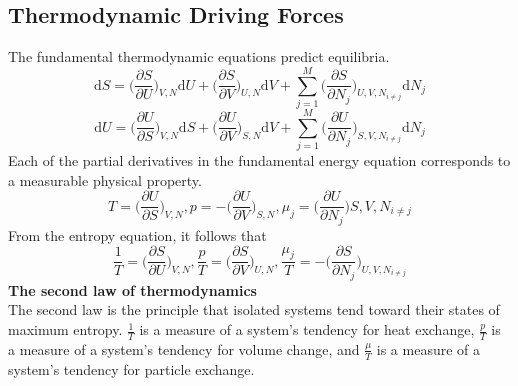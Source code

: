\documentclass[8pt]{article}
\numberwithin{equation}{section}
\begin{document}
\begin{multicols}{2}
\section{Thermodynamic Driving Forces}
The fundamental thermodynamic equations predict equilibria. 
\begin{equation}
\mathrm{d} S=\bigg(\frac{\partial S}{\partial U} \bigg)_{V,N} \mathrm{d} U + \bigg(\frac{\partial S}{\partial V}\bigg)_{U,N} \mathrm{d} V + \sum_{j=1}^{M}\bigg(\frac{\partial S}{\partial N_{j}}\bigg)_{U,V, N_{i\neq j}} \mathrm{d} N_{j}
\end{equation}
\begin{equation}
\mathrm{d} U=\bigg(\frac{\partial U}{\partial S} \bigg)_{V,N} \mathrm{d} S + \bigg(\frac{\partial U}{\partial V}\bigg)_{S,N} \mathrm{d} V + \sum_{j=1}^{M} \bigg(\frac{\partial U}{\partial N_{j}} \bigg)_{S,V, N_{i\neq j}} \mathrm{d} N_{j}
\end{equation}
Each of the partial derivatives in the fundamental energy equation corresponds to a measurable physical property. 
\begin{equation}
T=\bigg(\frac{\partial U}{\partial S}\bigg)_{V,N}, p=-\bigg(\frac{\partial U}{\partial V}\bigg)_{S,N}, \mu_{j}=\bigg( \frac{\partial U}{\partial N_{j}} \bigg){S,V, N_{i\neq j}} \tag{6.3}
\end{equation}
From the entropy equation, it follows that 
\begin{equation}
\frac{1}{T}=\bigg(\frac{\partial S}{\partial U} \bigg)_{V,N}, \frac{p}{T}=\bigg( \frac{\partial S}{\partial V} \bigg)_{U,N}, \frac{\mu_{j}}{T}=-\bigg( \frac{\partial S}{\partial N_{j}} \bigg)_{U,V, N_{i\neq j}} \tag{6.6}
\end{equation}
\textbf{The second law of thermodynamics}\\
The second law is the principle that isolated systems tend toward their states of maximum entropy. $\frac{1}{T}$ is a measure of a system's tendency for heat exchange, $\frac{p}{T}$ is a measure of a system's tendency for volume change, and $\frac{\mu}{T}$ is a measure of a system's tendency for particle exchange. 

\end{multicols}
\end{document}
